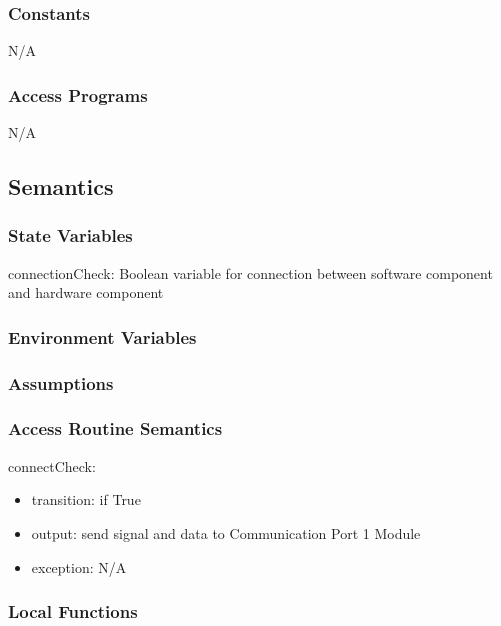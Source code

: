 \documentclass[12pt, titlepage]{article}
\begin{document}
\subsubsection{Constants}
N/A

\subsubsection{Access Programs}

N/A

\subsection{Semantics}

\subsubsection{State Variables}

connectionCheck: Boolean variable for connection between software component and hardware component

\subsubsection{Environment Variables}



\subsubsection{Assumptions}


\subsubsection{Access Routine Semantics}


\noindent connectCheck:
\begin{itemize}
\item transition: if True  
\item output: send signal and data to Communication Port 1 Module 
\item exception: N/A 
\end{itemize}


\subsubsection{Local Functions}
\end{document}
